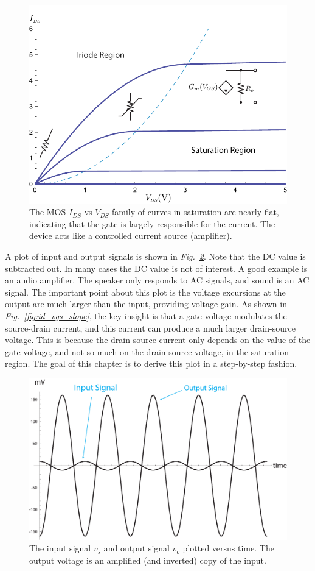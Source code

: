\begin{figure}[tb]
\centering
\includegraphics[width=.75\columnwidth]{mos_building_block}
\caption{The MOS $I_{DS}$ vs $V_{DS}$ family of curves in saturation are nearly flat, indicating that the gate is largely responsible for the current.  The device acts like a controlled current source (amplifier).}
\label{fig:mos_building_block}
\end{figure}
A plot of input and output signals is shown in \emph{Fig.~\ref{fig:gain}}.  Note that the DC value is subtracted out.  In many cases the DC value is not of interest.  A good example is an audio amplifier.  The speaker only responds to AC signals, and sound is an AC signal.  The important point about this plot is the voltage excursions at the output are much larger than the input, providing voltage gain.  As shown in \emph{Fig.~\ref{fig:id_vgs_slope}}, the key insight is that a gate voltage modulates the source-drain current, and this current can produce a much larger drain-source voltage.  This is because the drain-source current only depends on the value of the gate voltage, and not so much on the drain-source voltage, in the saturation region. The goal of this chapter is to derive this plot in a step-by-step fashion.
\begin{figure}[tb]
\centering
\includegraphics[width=.75\columnwidth]{gain}
\caption{The input signal $v_s$ and output signal $v_o$ plotted versus time.  The output voltage is an amplified (and inverted) copy of the input.}
\label{fig:gain}
\end{figure}
